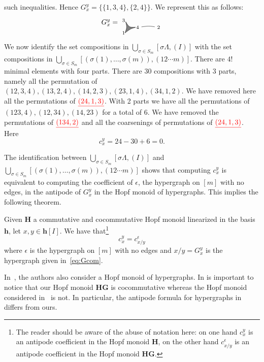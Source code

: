 \documentclass[ALCO,ThmDefs,Unicode,epreuves]{cedram}
\newcommand{\redun}[1]{\textcolor{red}{#1}}
\newcommand{\bH}{\mathbf{H}}
\newcommand{\bh}{\mathbf{h}}
\begin{document}
\begin{exam}
such inequalities. Hence $G_x^y=\big\{\{1,3,4\},\{2,4\}\big\}$. We represent this as follows:
$$G_x^y=
\begin{tikzpicture}[scale=.7,baseline=.5cm]
	\node (1) at (0,.1) {$\scriptstyle 1$};
	\node (2) at (2.5,.5) {$\scriptstyle 2$};
	\node (3) at (0,1) {$\scriptstyle 3$};
	\node (4) at (1,.5) {$\scriptstyle 4$};
	\draw [fill=gray] (.1,.1) .. controls (.25,.5) .. (.15,.9) .. controls (.4,.5) .. (.85,.5) .. controls (.5,.4) .. (.1,.1) ; 
	\draw (4).. controls (1.8,.6) ..(2);
\end{tikzpicture} 
$$
We now identify the set compositions in $\bigcup_{\sigma\in S_m} [\sigma\Lambda,(I)]$ with the set compositions in $\bigcup_{\sigma\in S_m}[(\sigma(1),\ldots,\sigma(m)),(12\cdots m)]$. There are $4!$ minimal elements with four parts. There are 30 compositions with 3 parts, namely all the permutation of $(12,3,4),(13,2,4),(14,2,3),(23,1,4),(34,1,2)$.
We have removed here all the permutations of $\redun{\underline{(24,1,3)}}$. With 2 parts we have all the permutations of $(123,4), (12,34),(14,23)$ for a total of 6. We have removed the permutations of 
$\redun{\underline{(134,2)}}$ and all the coarsenings of permutations of $\redun{\underline{(24,1,3)}}$. Here
 $$c_x^y=24-30+6=0.$$
\end{exam}

The identification between $\bigcup_{\sigma\in S_m} [\sigma\Lambda,(I)]$ and $\bigcup_{\sigma\in S_m}[(\sigma(1),\ldots,\sigma(m)),(12\cdots m)]$ shows that computing $c_x^y$ is equivalent 
to computing the coefficient of $\epsilon$, the hypergraph on $[m]$ with no edges, in the antipode of $G_x^y$ in the Hopf monoid of hypergraphs. This implies the following theorem.
\begin{theorem}\label{thm:hyper}
 Given ${\bH}$ a commutative and cocommutative Hopf monoid linearized in the basis $\bh$, let $x,y\in \mathbf{h}[I]$. We have that\footnote{The reader should be aware of the abuse of notation here: on one hand $c_x^y$ is an antipode coefficient in the Hopf monoid ${\bH}$, on the other hand $c_{x/y}^\epsilon $ is an antipode coefficient in the Hopf monoid $\mathbf{HG}$.}
 $$ c_x^y = c_{x/y}^\epsilon $$
 where $\epsilon$ is the hypergraph on $[m]$ with no edges and $x/y=G_x^y$ is the hypergraph given in~\eqref{eq:Gcom}.
\end{theorem}

\begin{rema} In~\cite{Aguiar-Ardila}, the authors also consider a Hopf monoid of hypergraphs. In is important to notice that our Hopf monoid $\mathbf{HG}$ is cocommutative whereas the Hopf monoid considered 
in~\cite{Aguiar-Ardila} is not. In particular, the antipode formula for hypergraphs in~\cite{Aguiar-Ardila} differs from ours. %
\end{rema}
\end{document}

